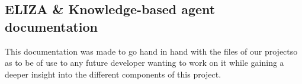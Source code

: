 \subsection*{E\+L\+I\+ZA \& Knowledge-\/based agent documentation}

This documentation was made to go hand in hand with the files of our projectso as to be of use to any future developer wanting to work on it while gaining a deeper insight into the different components of this project. 